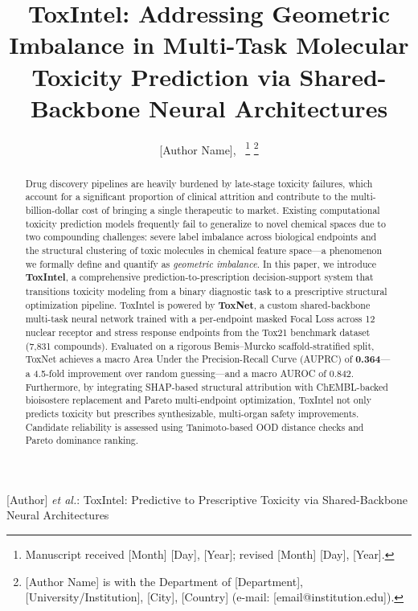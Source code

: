 \documentclass[lettersize,journal]{IEEEtran}
\begin{document}
  \title{ToxIntel: Addressing Geometric Imbalance in Multi-Task Molecular Toxicity Prediction via Shared-Backbone Neural Architectures}

  \author{[Author Name],~
  \thanks{Manuscript received [Month] [Day], [Year]; revised [Month] [Day], [Year].}
  \thanks{[Author Name] is with the Department of [Department], [University/Institution], [City], [Country] (e-mail: [email@institution.edu]).}}

  {[Author] \MakeLowercase{\textit{et al.}}: ToxIntel: Predictive to Prescriptive Toxicity via Shared-Backbone Neural Architectures}

  \maketitle

\begin{abstract}
Drug discovery pipelines are heavily burdened by late-stage toxicity failures,
which account for a significant proportion of clinical attrition and contribute
to the multi-billion-dollar cost of bringing a single therapeutic to market.
Existing computational toxicity prediction models frequently fail to generalize
to novel chemical spaces due to two compounding challenges: severe label
imbalance across biological endpoints and the structural clustering of toxic
molecules in chemical feature space---a phenomenon we formally define and
quantify as \textit{geometric imbalance}.
In this paper, we introduce \textbf{ToxIntel}, a comprehensive
prediction-to-prescription decision-support system that transitions toxicity
modeling from a binary diagnostic task to a prescriptive structural
optimization pipeline.
ToxIntel is powered by \textbf{ToxNet}, a custom shared-backbone multi-task
neural network trained with a per-endpoint masked Focal Loss across 12 nuclear
receptor and stress response endpoints from the Tox21 benchmark dataset
(7,831 compounds).
Evaluated on a rigorous Bemis--Murcko scaffold-stratified split, ToxNet
achieves a macro Area Under the Precision-Recall Curve (AUPRC) of
\textbf{0.364}---a 4.5-fold improvement over random guessing---and a macro
AUROC of 0.842.
Furthermore, by integrating SHAP-based structural attribution with
ChEMBL-backed bioisostere replacement and Pareto multi-endpoint optimization,
ToxIntel not only predicts toxicity but prescribes synthesizable,
multi-organ safety improvements.
Candidate reliability is assessed using Tanimoto-based OOD distance checks and
Pareto dominance ranking.
\end{abstract}
\end{document}
